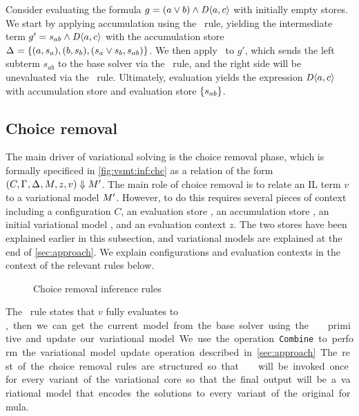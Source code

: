 Consider evaluating the formula $g=(a\vee b)\wedge\chc[D]{a,c}$ with initially
empty stores. We start by applying accumulation using the \evAcc\ rule,
yielding the intermediate term $g'=s_{ab}\wedge\chc[D]{a,c}$ with the
accumulation store $\aStore{}=\set{(a,s_a),(b,s_b),(s_a \vee s_b,s_{ab})}$. We
then apply \evAndL\ to $g'$, which sends the left subterm $s_{ab}$ to the base
solver via the \evSym\ rule, and the right side will be unevaluated via the
\evChc\ rule.
%
Ultimately, evaluation yields the expression $\chc[D]{a,c}$ with accumulation
store \aStore{} and evaluation store $\set{s_{ab}}$.


\subsection{Choice removal}
%
The main driver of variational solving is the choice removal phase, which is
formally specificed in \autoref{fig:vsmt:inf:chc} as a relation of the form
$(C,\Gamma_{},\Delta_{},M_{},z,v)\Downarrow M_{}'$.
%
The main role of choice removal is to relate an IL term $v$ to a variational
model $M_{}'$. However, to do this requires several pieces of context
including a configuration $C$, an evaluation store \eStore{}, an accumulation
store \aStore{}, an initial variational model \vmodel{}, and an evaluation
context $z$. The two stores have been explained earlier in this subsection, and
variational models are explained at the end of \autoref{sec:approach}. We
explain configurations and evaluation contexts in the context of the relevant
rules below.


\begin{figure}
  
  \caption{Choice removal inference rules}%
  \label{fig:vsmt:inf:chc}
\end{figure}


The \crEval\ rule states that $v$ fully evaluates to \unit, then we can get the
current model from the base solver using the \pmodel\ primitive and update our
variational model. We use the operation \texttt{Combine} to perform the
variational model update operation described in \autoref{sec:approach}.
%
The rest of the choice removal rules are structured so that \crEval\ will be
invoked once for every variant of the variational core so that the final output
will be a variational model that encodes the solutions to every variant of the
original formula.


